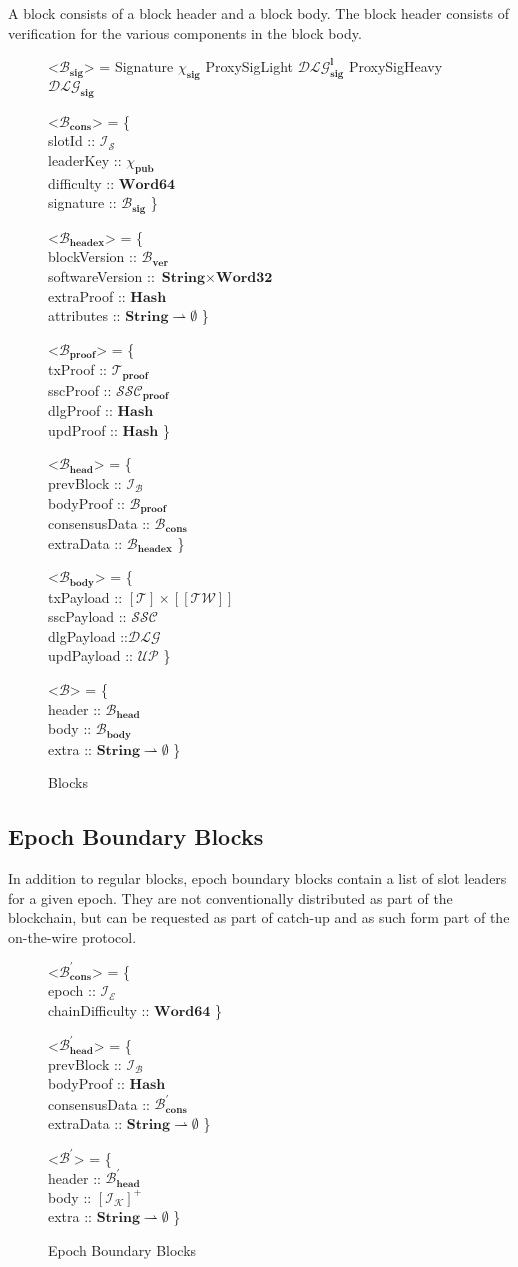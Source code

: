 \documentclass{article}
\def\fld{\\\llap{,\quad}}%
\newcommand{\rhu}{\rightharpoonup}
\newcommand{\lists}[1]{\left[{#1}\right]}
\newcommand{\nelists}[1]{\left[{#1}\right]^+}
\newcommand{\idsof}[1]{\mathcal{I}\!_#1}
\newcommand{\blockids}{\idsof{\blocks}}
\newcommand{\epochids}{\idsof{\mathcal{E}}}
\newcommand{\slotids}{\idsof{\mathcal{S}}}
\newcommand{\stakeholderids}{\idsof{\mathcal{K}}}
\newcommand{\pubkey}{\chi_{\textbf{pub}}}
\newcommand{\signature}{\chi_{\textbf{sig}}}
\newcommand{\txs}{\mathcal{T}}
\newcommand{\txpf}{\txs_{\textbf{proof}}}
\newcommand{\twit}{\mathcal{TW}}
\newcommand{\ssc}{\mathcal{SSC}}
\newcommand{\sscpf}{\ssc_{\textbf{proof}}}
\newcommand{\dlg}{\mathcal{DLG}}
\newcommand{\proxysig}{\dlg_{\textbf{sig}}}
\newcommand{\proxysiglight}{\dlg^{\textbf{l}}_{\textbf{sig}}}
\newcommand{\upd}{\mathcal{UP}}
\newcommand{\blocks}{\mathcal{B}}
\newcommand{\blockver}{\blocks_{\textbf{ver}}}
\newcommand{\bbodies}{\blocks_{\textbf{body}}}
\newcommand{\bheads}{\blocks_{\textbf{head}}}
\newcommand{\bheadcons}{\blocks_{\textbf{cons}}}
\newcommand{\bheadex}{\blocks_{\textbf{headex}}}
\newcommand{\blocksig}{\blocks_{\textbf{sig}}}
\newcommand{\blockpf}{\blocks_{\textbf{proof}}}
\newcommand{\ebb}{\mathcal{B}^\prime}
\newcommand{\ebbhead}{\ebb_{\textbf{head}}}
\newcommand{\ebbheadcons}{\ebb_{\textbf{cons}}}
\newcommand{\hstype}[1]{\textbf{#1}}
\newcommand{\String}{\hstype{String}}
\newcommand{\Word}[1]{\hstype{Word#1}}
\newcommand{\hash}{\hstype{Hash}}
\begin{document}
A block consists of a block header and a block body. The block header consists
of verification for the various components in the block body.

\begin{figure}[H]
  \caption{Blocks}
  \label{fig:block}
  \begin{grammar}
    <$\blocksig$> = Signature $\signature$
    \alt ProxySigLight $\proxysiglight$
    \alt ProxySigHeavy $\proxysig$

    <$\bheadcons$> = \{
    \fld slotId :: $\slotids$
    \fld leaderKey :: $\pubkey$
    \fld difficulty :: $\Word{64}$
    \fld signature :: $\blocksig$
    \}

    <$\bheadex$> = \{
    \fld blockVersion :: $\blockver$
    \fld softwareVersion :: $\String \times \Word{32}$
    \fld extraProof :: $\hash$
    \fld attributes :: $\String \rhu \emptyset$
    \}

    <$\blockpf$> = \{
    \fld txProof :: $\txpf$
    \fld sscProof :: $\sscpf$
    \fld dlgProof :: $\hash$
    \fld updProof :: $\hash$
    \}

    <$\bheads$> = \{
    \fld prevBlock :: $\blockids$
    \fld bodyProof :: $\blockpf$
    \fld consensusData :: $\bheadcons$
    \fld extraData :: $\bheadex$
    \}

    <$\bbodies$> = \{
    \fld txPayload :: $\lists{\txs}\times\lists{\lists{\twit}}$
    \fld sscPayload :: $\ssc$
    \fld dlgPayload ::$\dlg$
    \fld updPayload :: $\upd$
    \}

    <$\blocks$> = \{
    \fld header :: $\bheads$
    \fld body :: $\bbodies$
    \fld extra :: $\String \rhu \emptyset$
    \}

  \end{grammar}
\end{figure}

\subsection{Epoch Boundary Blocks}

In addition to regular blocks, epoch boundary blocks contain a list of slot
leaders for a given epoch. They are not conventionally distributed as part of
the blockchain, but can be requested as part of catch-up and as such form part
of the on-the-wire protocol.

\begin{figure}[H]
  \begin{grammar}
    <$\ebbheadcons$> = \{
    \fld epoch :: $\epochids$
    \fld chainDifficulty :: $\Word{64}$
    \}

    <$\ebbhead$> = \{
    \fld prevBlock :: $\blockids$
    \fld bodyProof :: $\hash$
    \fld consensusData :: $\ebbheadcons$
    \fld extraData :: $\String \rhu \emptyset$
    \}

    <$\ebb$> = \{
    \fld header :: $\ebbhead$
    \fld body :: $\nelists{\stakeholderids}$
    \fld extra :: $\String \rhu \emptyset$
    \}
  \end{grammar}
  \caption{Epoch Boundary Blocks}
  \label{fig:ebb}
\end{figure}
\end{document}
